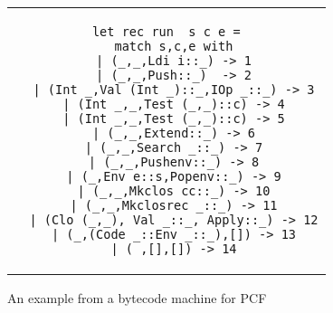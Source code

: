 \begin{figure}%
\centering
\begin{tabular}{c} %

\begin{lstlisting}
let rec run  s c e =
  match s,c,e with
  | (_,_,Ldi i::_) -> 1
  | (_,_,Push::_)  -> 2
  | (Int _,Val (Int _)::_,IOp _::_) -> 3
  | (Int _,_,Test (_,_)::c) -> 4
  | (Int _,_,Test (_,_)::c) -> 5
  | (_,_,Extend::_) -> 6
  | (_,_,Search _::_) -> 7
  | (_,_,Pushenv::_) -> 8
  | (_,Env e::s,Popenv::_) -> 9
  | (_,_,Mkclos cc::_) -> 10
  | (_,_,Mkclosrec _::_) -> 11
  | (Clo (_,_), Val _::_, Apply::_) -> 12
  | (_,(Code _::Env _::_),[]) -> 13
  | (_,[],[]) -> 14
\end{lstlisting}
\end{tabular}
\caption{An example from a bytecode machine for PCF}
\label{fig:pcf}
\end{figure}

